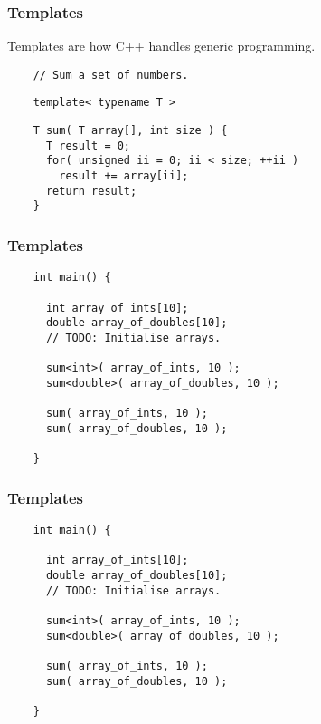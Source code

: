 \begin{frame}[fragile]
  \frametitle{Templates}
  Templates are how C++ handles generic programming.
  \begin{example}
    \begin{verbatim}
    // Sum a set of numbers.\end{verbatim}{\color{BrickRed}\begin{verbatim}
    template< typename T >\end{verbatim}}\begin{verbatim}
    T sum( T array[], int size ) {
      T result = 0;
      for( unsigned ii = 0; ii < size; ++ii )
        result += array[ii];
      return result;
    }
    \end{verbatim}
  \end{example}
\end{frame}

\begin{frame}[fragile]
  \frametitle{Templates}
  \begin{example}
    \begin{lstlisting}
    int main() {

      int array_of_ints[10];
      double array_of_doubles[10];
      // TODO: Initialise arrays.

      sum<int>( array_of_ints, 10 );
      sum<double>( array_of_doubles, 10 );

      sum( array_of_ints, 10 );
      sum( array_of_doubles, 10 );

    }
    \end{lstlisting}
  \end{example}
\end{frame}

\begin{frame}[fragile]
  \frametitle{Templates}
  \begin{example}
    \begin{lstlisting}
    int main() {

      int array_of_ints[10];
      double array_of_doubles[10];
      // TODO: Initialise arrays.

      sum<int>( array_of_ints, 10 );
      sum<double>( array_of_doubles, 10 );

      sum( array_of_ints, 10 );
      sum( array_of_doubles, 10 );

    }
    \end{lstlisting}
  \end{example}
\end{frame}


